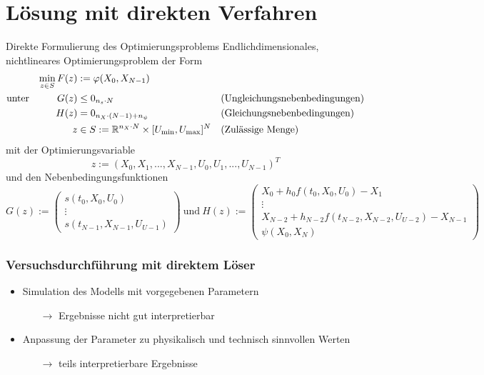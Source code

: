\documentclass[aspectratio=169]{beamer}
\newcommand{\R}{\mathbb{R}}
\begin{document}
\section{Lösung mit direkten Verfahren}
\begin{frame}
  \begin{block}{Direkte Formulierung des Optimierungsproblems}
    \scriptsize
    Endlichdimensionales, nichtlineares Optimierungsproblem der Form
    \begin{align*}
        \min_{z \in S} F(z) &:= \varphi(X_0,X_{N-1}) & & \\
        \text{unter} \hspace{10mm} G(z) &\leq 0_{n_s \cdot N} & &  \text{(Ungleichungsnebenbedingungen)} \\
        H(z) &= 0_{n_X \cdot (N-1) + n_{\psi}} & & \text{(Gleichungsnebenbedingungen)}\\
        z &\in S := \R^{n_X \cdot N} \times [U_{\min},U_{\max}]^{N} & &  \text{(Zulässige Menge)}
    \end{align*}
    mit der Optimierungsvariable
    \begin{equation*}
        z := (X_0,X_1,...,X_{N-1},U_0,U_1,...,U_{N-1})^T
    \end{equation*}
    und den Nebenbedingungsfunktionen 
    \begin{equation*}
        G(z) := 
        \begin{pmatrix}
            s(t_0,X_0,U_0) \\ 
            \vdots \\ 
            s(t_{N-1},X_{N-1},U_{U-1})
        \end{pmatrix}
        \ \text{und}\ H(z) := 
        \begin{pmatrix}
            X_0 + h_0 f(t_0,X_0,U_0) - X_1 \\ 
            \vdots \\ 
            X_{N-2} + h_{N-2} f(t_{N-2},X_{N-2},U_{U-2}) - X_{N-1} \\
            \psi(X_0,X_N)
        \end{pmatrix} 
    \end{equation*}
    \end{block}
\end{frame}

\begin{frame}
  \frametitle{Versuchsdurchführung mit direktem Löser}
  \begin{itemize}
    \item Simulation des Modells mit vorgegebenen Parametern
    \begin{itemize}
      \item[\(\rightarrow\)] Ergebnisse nicht gut interpretierbar
    \end{itemize}
    \item Anpassung der Parameter zu physikalisch und technisch sinnvollen Werten
    \begin{itemize}
      \item[\(\rightarrow\)] teils interpretierbare Ergebnisse
    \end{itemize}
  \end{itemize}
\end{frame}
\end{document}
